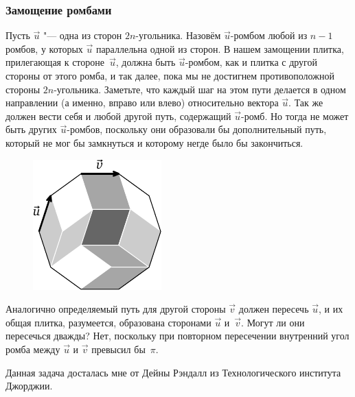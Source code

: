 \documentclass[twoside]{book}
\makeatletter
\newcommand{\rindex}[2][\imki@jobname]{%
\index[#1]{\detokenize{#2}}%
}
\makeatother
\begin{document}
\subsubsection*{Замощение ромбами}%

Пусть $\vec u$ "--- одна из сторон $2n$-угольника.
Назовём $\vec
u$-ромбом любой из $n-1$ ромбов, у которых $\vec u$ параллельна одной
из сторон.
В нашем замощении плитка, прилегающая к стороне~$\vec u$,
должна быть $\vec u$-ромбом, как и плитка с другой стороны от этого
ромба, и так далее, пока мы не достигнем противоположной стороны
$2n$-угольника.
Заметьте, что каждый шаг на этом пути делается в
одном
направлении (а именно, вправо или влево) относительно вектора $\vec u$. 
Так же должен вести себя и любой другой путь, содержащий $\vec u$-ромб.
Но тогда не может быть других $\vec u$-ромбов, поскольку они
образовали бы дополнительный путь, который не мог бы замкнуться и которому негде было бы закончиться.


\begin{figure}[h]
\centering
\includegraphics{mp/wink-14} 
\end{figure}

Аналогично определяемый путь для другой стороны $\vec v$ должен пересечь $\vec u$, и их общая плитка, разумеется, образована сторонами $\vec u$ и~$\vec v$.
Могут ли они пересечься дважды?
Нет, поскольку при повторном пересечении внутренний угол ромба между $\vec u$ и $\vec v$ превысил бы~$\pi$. \heart

\medskip

Данная задача досталась мне от Дейны Рэндалл из Технологического
института Джорджии. 



\end{document}
